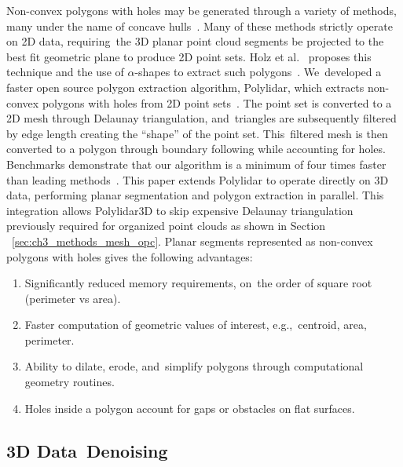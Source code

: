 Non-convex polygons with holes may be generated through a variety of methods, many under the name of concave hulls~\cite{edelsbrunner_shape_1983, furieri_spatialite_2017, open_source_geospatial_foundation_postgis_2019}. Many of these methods strictly operate on 2D data, requiring~the 3D planar point cloud segments be projected to the best fit geometric plane to produce 2D point sets. Holz et al.~\cite{lee_fast_2013} proposes this technique and the use of $\alpha$-shapes to extract such polygons~\cite{edelsbrunner_shape_1983}.  We~developed a faster open source polygon extraction algorithm, Polylidar, which extracts non-convex polygons with holes from 2D point sets~\cite{castagno_polylidar_2020}. The point set is converted to a 2D mesh through Delaunay triangulation, and~triangles are subsequently filtered by edge length creating the ``shape'' of the point set. This~filtered mesh is then converted to a polygon through boundary following while accounting for holes. Benchmarks demonstrate that our algorithm is a minimum of four times faster than leading methods~\cite{polylidar_benchmark_concave}. This paper extends Polylidar to operate directly on 3D data, performing planar segmentation and polygon extraction in parallel. This integration allows Polylidar3D to skip expensive Delaunay triangulation previously required for organized point clouds as shown in Section ~\ref{sec:ch3_methods_mesh_opc}.  Planar segments represented as non-convex polygons with holes gives the following advantages:

\begin{enumerate}
    \item Significantly reduced memory requirements, on~the order of square root (perimeter vs area).
    \item Faster computation of geometric values of interest, e.g.,~centroid, area, perimeter.
    \item Ability to dilate, erode, and~simplify polygons through computational geometry routines.
    \item Holes inside a polygon account for gaps or obstacles on flat surfaces.
\end{enumerate}

\subsection{3D Data~Denoising}\label{sec:ch3_bg_mesh_smoothing}

